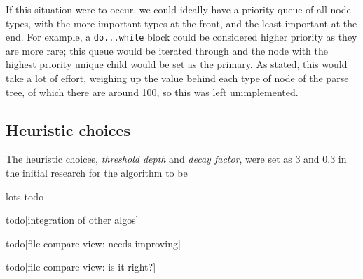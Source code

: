 If this situation were to occur, we could ideally have a priority queue of all
node types, with the more important types at the front, and the least important
at the end. For example, a \texttt{do...while} block could be considered higher
priority as they are more rare; this queue would be iterated through and the 
node with the highest priority unique child would be set as the primary. As stated,
this would take a lot of effort, weighing up the value behind each type of node
of the parse tree, of which there are around 100, so this was left unimplemented.



\subsection{Heuristic choices}
The heuristic choices, \emph{threshold depth} and \emph{decay factor}, were 
set as 3 and 0.3 in the initial research for the algorithm to be 

\newpage lots todo

todo[integration of other algos]

todo[file compare view: needs improving]

todo[file compare view: is it right?]